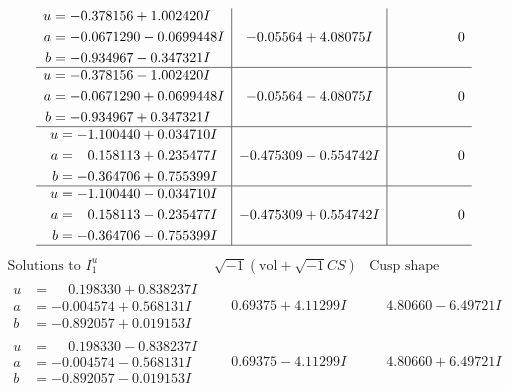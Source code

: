\documentclass[1p]{elsarticle_modified}
\theoremstyle{definition}
\newcommand{\I}{\sqrt{-1}}
\begin{document}
$$\begin{array}{c|c|c}
\begin{aligned}
u &= -0.378156 + 1.002420 I \\
a &= -0.0671290 - 0.0699448 I \\
b &= -0.934967 - 0.347321 I\end{aligned}
 & -0.05564 + 4.08075 I & \phantom{-0.000000 } 0 \\ \hline\begin{aligned}
u &= -0.378156 - 1.002420 I \\
a &= -0.0671290 + 0.0699448 I \\
b &= -0.934967 + 0.347321 I\end{aligned}
 & -0.05564 - 4.08075 I & \phantom{-0.000000 } 0 \\ \hline\begin{aligned}
u &= -1.100440 + 0.034710 I \\
a &= \phantom{-}0.158113 + 0.235477 I \\
b &= -0.364706 + 0.755399 I\end{aligned}
 & -0.475309 - 0.554742 I & \phantom{-0.000000 } 0 \\ \hline\begin{aligned}
u &= -1.100440 - 0.034710 I \\
a &= \phantom{-}0.158113 - 0.235477 I \\
b &= -0.364706 - 0.755399 I\end{aligned}
 & -0.475309 + 0.554742 I & \phantom{-0.000000 } 0\\
 \hline 
 \end{array}$$\newpage$$\begin{array}{c|c|c}  
\text{Solutions to }I^u_{1}& \I (\text{vol} + \sqrt{-1}CS) & \text{Cusp shape}\\
 \hline 
\begin{aligned}
u &= \phantom{-}0.198330 + 0.838237 I \\
a &= -0.004574 + 0.568131 I \\
b &= -0.892057 + 0.019153 I\end{aligned}
 & \phantom{-}0.69375 + 4.11299 I & \phantom{-}4.80660 - 6.49721 I \\ \hline\begin{aligned}
u &= \phantom{-}0.198330 - 0.838237 I \\
a &= -0.004574 - 0.568131 I \\
b &= -0.892057 - 0.019153 I\end{aligned}
 & \phantom{-}0.69375 - 4.11299 I & \phantom{-}4.80660 + 6.49721 I \\ \hline\begin{aligned}

\end{aligned}
\end{array}$$
\end{document}
